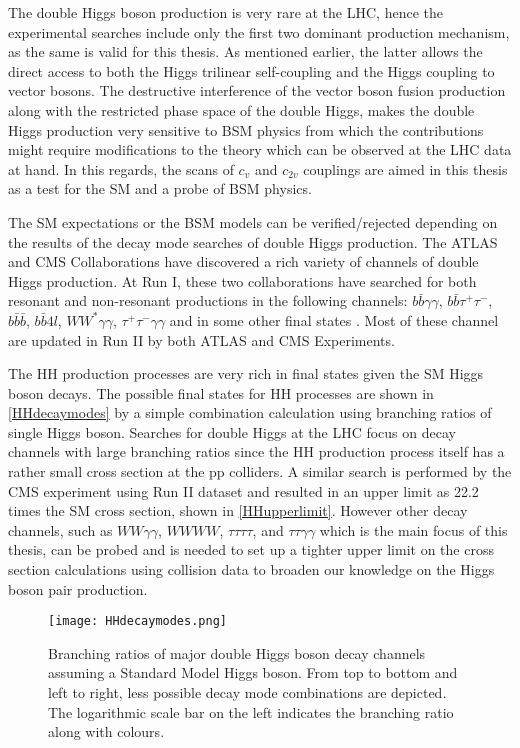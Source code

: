 The double Higgs boson production is very rare at the LHC, hence the experimental searches include only the first two dominant production mechanism, as the same is valid for this thesis. As mentioned earlier, the latter allows the direct access to both the Higgs trilinear self-coupling and the Higgs coupling to vector bosons. The destructive interference of the vector boson fusion production along with the restricted phase space of the double Higgs, makes the double Higgs production very sensitive to BSM physics from which the contributions might require modifications to the theory which can be observed at the LHC data at hand. In this regards, the scans of $c_v$ and $c_{2v}$ couplings are aimed in this thesis as a test for the SM and a probe of BSM physics.

The SM expectations or the BSM models can be verified/rejected depending on the results of the decay mode searches of double Higgs production. The ATLAS and CMS Collaborations have discovered a rich variety of channels of double Higgs production. At Run I, these two collaborations have searched for both resonant and non-resonant productions in the following channels: $b\bar b\gamma\gamma$, $b\bar b\tau^+\tau^-$, $b\bar b\bar b$, $b\bar b4l$, $WW^*\gamma\gamma$, $\tau^+\tau^-\gamma\gamma$ and in some other final states \cite{pdg}. Most of these channel are updated in Run II by both ATLAS\cite{Aad2020} and CMS\cite{Sirunyan2019} Experiments.

The HH production processes are very rich in final states given the SM Higgs boson decays. The possible final states for HH processes are shown in \autoref{HHdecaymodes} by a simple combination calculation using branching ratios of single Higgs boson. Searches for double Higgs at the LHC focus on decay channels with large branching ratios since the HH production process itself has a rather small cross section at the pp colliders. A similar search is performed by the CMS experiment using Run II dataset and resulted in an upper limit as 22.2 times the SM cross section, shown in \autoref{HHupperlimit}. However other decay channels, such as $WW\gamma\gamma$, $WWWW$, $\tau\tau\tau\tau$, and $\tau\tau\gamma\gamma$ which is the main focus of this thesis, can be probed and is needed to set up a tighter upper limit on the cross section calculations using collision data to broaden our knowledge on the Higgs boson pair production. 

\begin{figure}[ht]
	\centering
	\texttt{[image: HHdecaymodes.png]}
	\vspace{2mm}
	\caption[Branching ratio of major double Higgs boson decay channels assuming a Standard Model Higgs boson. From top to bottom and left to right, less possible decay mode combinations are depicted. The logarithmic scale bar on the left indicates the branching ratio along with colours.]
	{Branching ratios of major double Higgs boson decay channels assuming a Standard Model Higgs boson\cite{Gouzevitch2020}. From top to bottom and left to right, less possible decay mode combinations are depicted. The logarithmic scale bar on the left indicates the branching ratio along with colours.}
	\label{HHdecaymodes}
\end{figure}

